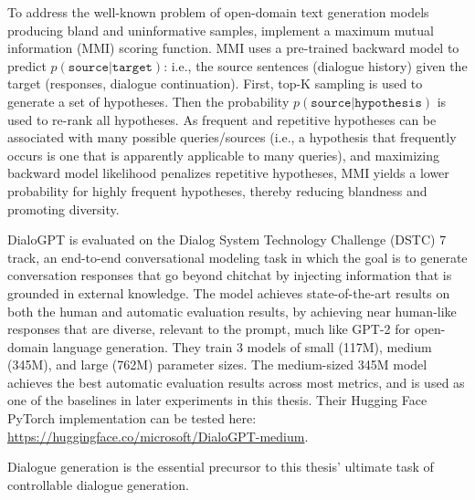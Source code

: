 To address the well-known problem of open-domain text generation models producing bland and uninformative samples, \cite{zhang2019dialogpt} implement a maximum mutual information (MMI) scoring function. MMI uses a pre-trained backward model to predict $p(\texttt{source} | \texttt{target})$: i.e., the source sentences (dialogue history) given the target (responses, dialogue continuation). First, top-K sampling is used to generate a set of hypotheses. Then the probability $p(\texttt{source} | \texttt{hypothesis})$ is used to re-rank all hypotheses. As frequent and repetitive hypotheses can be associated with many possible queries/sources (i.e., a hypothesis that frequently occurs is one that is apparently applicable to many queries), and maximizing backward model likelihood penalizes repetitive hypotheses, MMI yields a lower probability for highly frequent hypotheses, thereby reducing blandness and promoting diversity. 

DialoGPT is evaluated on the Dialog System Technology Challenge (DSTC) 7 track, an end-to-end conversational modeling task in which the goal is to generate conversation responses that go beyond chitchat by injecting information that is grounded in external knowledge. The model achieves state-of-the-art results on both the human and automatic evaluation results, by achieving near human-like responses that are diverse, relevant to the prompt, much like GPT-2 for open-domain language generation. They train 3 models of small (117M), medium (345M), and large (762M) parameter sizes. The medium-sized 345M model achieves the best automatic evaluation results across most metrics, and is used as one of the baselines in later experiments in this thesis. Their Hugging Face PyTorch implementation can be tested here: \url{https://huggingface.co/microsoft/DialoGPT-medium}.

Dialogue generation is the essential precursor to this thesis' ultimate task of controllable dialogue generation.




